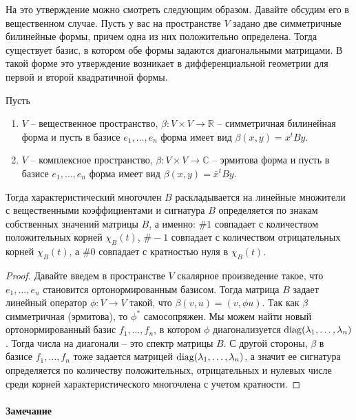 На это утверждение можно смотреть следующим образом.
Давайте обсудим его в вещественном случае.
Пусть у вас на пространстве $V$ задано две симметричные билинейные формы, причем одна из них положительно определена.
Тогда существует базис, в котором обе формы задаются диагональными матрицами.
В такой форме это утверждение возникает в дифференциальной геометрии для первой и второй квадратичной формы.

\begin{claim}
Пусть 
\begin{enumerate}
\item
$V$ -- вещественное пространство, $\beta\colon V\times V\to \mathbb R$ -- симметричная билинейная форма и пусть в базисе $e_1,\ldots,e_n$ форма имеет вид $\beta(x, y) = x^t B y$.

\item
$V$ -- комплексное пространство, $\beta\colon V\times V\to \mathbb C$ -- эрмитова форма и пусть в базисе $e_1,\ldots,e_n$ форма имеет вид $\beta(x, y) = \bar x^t B y$.

\end{enumerate}
Тогда характеристический многочлен $B$ раскладывается на линейные множители с вещественными коэффициентами и сигнатура $B$ определяется по знакам собственных значений матрицы $B$, а именно: $\#1$ совпадает с количеством положительных корней $\chi_B(t)$, $\#-1$ совпадает с количеством отрицательных корней $\chi_B(t)$, а $\#0$ совпадает с кратностью нуля в $\chi_B(t)$.
\end{claim}
\begin{proof}
Давайте введем в пространстве $V$ скалярное произведение такое, что $e_1,\ldots,e_n$ становится ортонормированным базисом.
Тогда матрица $B$ задает линейный оператор $\phi\colon V \to V$ такой, что $\beta(v, u) = (v, \phi u)$.
Так как $\beta$ симметричная (эрмитова), то $\phi^*$ самосопряжен.
Мы можем найти новый ортонормированный базис $f_1,\ldots,f_n$, в котором $\phi$ диагонализуется $\operatorname{diag}(\lambda_1,\ldots,\lambda_n)$.
Тогда числа на диагонали -- это спектр матрицы $B$.
С другой стороны, $\beta$ в базисе $f_1,\ldots,f_n$ тоже задается матрицей $\operatorname{diag}(\lambda_1,\ldots,\lambda_n)$, а значит ее сигнатура определяется по количеству положительных, отрицательных и нулевых числе среди корней характеристического многочлена с учетом кратности.
\end{proof}

\paragraph{Замечание}

